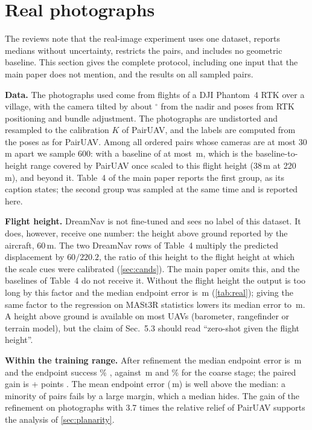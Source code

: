\section{Real photographs}
\label{sec:real}

The reviews note that the real-image experiment uses one dataset, reports medians without uncertainty, restricts the pairs, and includes no geometric baseline. This section gives the complete protocol, including one input that the main paper does not mention, and the results on all sampled pairs.

\noindent\textbf{Data.} The \rlImages{} photographs used come from flights of a DJI Phantom~4 RTK over a village, with the camera tilted by about \rlTilt$^\circ$ from the nadir and poses from RTK positioning and bundle adjustment. The photographs are undistorted and resampled to the calibration $K$ of PairUAV, and the labels are computed from the poses as for PairUAV. Among all ordered pairs whose cameras are at most 30\,m apart we sample 600: \rlNin{} with a baseline of at most \rlInMax\,m, which is the baseline-to-height range covered by PairUAV once scaled to this flight height (38\,m at 220\,m), and \rlNout{} beyond it. Table~4 of the main paper reports the first group, as its caption states; the second group was sampled at the same time and is reported here.

\noindent\textbf{Flight height.} DreamNav is not fine-tuned and sees no label of this dataset. It does, however, receive one number: the height above ground reported by the aircraft, 60\,m. The two DreamNav rows of Table~4 multiply the predicted displacement by $60/220.2$, the ratio of this height to the flight height at which the scale cues were calibrated (\cref{sec:cands}). The main paper omits this, and the baselines of Table~4 do not receive it. Without the flight height the output is too long by this factor and the median endpoint error is \rlNoHeightPos\,m (\cref{tab:real}); giving the same factor to the regression on MASt3R statistics lowers its median error to \rlMlpPos\,m. A height above ground is available on most UAVs (barometer, rangefinder or terrain model), but the claim of Sec.~5.3 should read ``zero-shot given the flight height''.



\noindent\textbf{Within the training range.} After refinement the median endpoint error is \rlSiiPos\,m and the endpoint success \rlSiiSRe\% \ci{\rlSiiSReLo}{\rlSiiSReHi}, against \rlSiPos\,m and \rlSiSRe\% \ci{\rlSiSReLo}{\rlSiSReHi} for the coarse stage; the paired gain is +\rlGainSRe{} points \ci{\rlGainSReLo}{\rlGainSReHi}. The mean endpoint error (\rlSiiEPEmean\,m) is well above the median: a minority of pairs fails by a large margin, which a median hides. The gain of the refinement on photographs with 3.7 times the relative relief of PairUAV supports the analysis of \cref{sec:planarity}.

